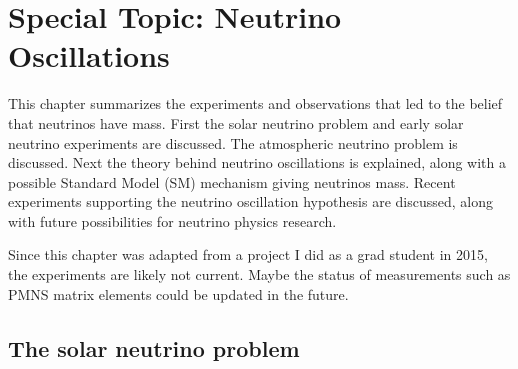 \chapter{Special Topic: Neutrino Oscillations}\label{ap:spec_neutrino}

This chapter summarizes the experiments and observations that led to the belief
that neutrinos have mass. First the solar neutrino problem and early solar
neutrino experiments are discussed. The atmospheric neutrino problem is
discussed. Next the theory behind neutrino oscillations is explained, along
with a possible Standard Model (SM) mechanism giving neutrinos mass. Recent
experiments supporting the neutrino oscillation hypothesis are discussed,
along with future possibilities for neutrino physics research.

Since this chapter was adapted from a project I did as a grad student in 2015,
the experiments are likely not current. Maybe the status of measurements
such as PMNS matrix elements could be updated in the future.

\section{The solar neutrino problem}

